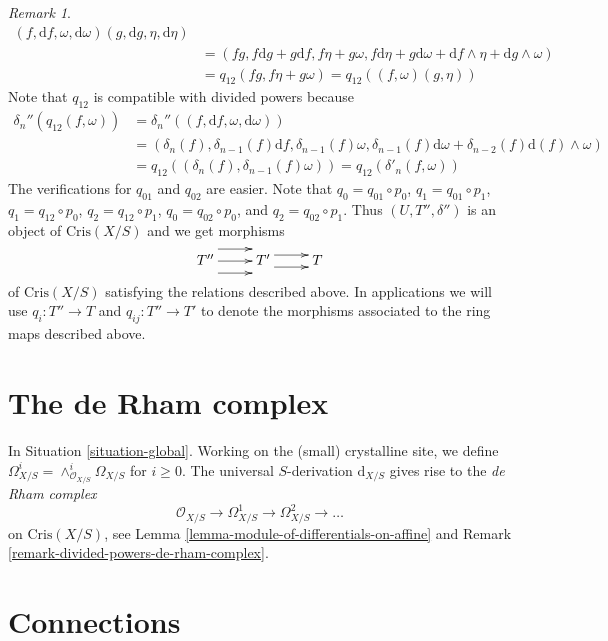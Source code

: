 \documentclass{stacks-project}
\theoremstyle{plain}
\theoremstyle{definition}
\theoremstyle{remark}
\newtheorem{remark}[subsection]{Remark}
\numberwithin{equation}{subsection}
\begin{document}
\begin{remark}
\begin{align*}
(f, \text{d}f, \omega, \text{d}\omega)(g, \text{d}g, \eta, \text{d}\eta) \\
& =
(fg, f\text{d}g + g \text{d}f, f\eta + g\omega,
f\text{d}\eta + g\text{d}\omega + \text{d}f \wedge \eta +
\text{d}g \wedge \omega) \\
& = q_{12}(fg, f\eta + g\omega) = q_{12}((f, \omega)(g, \eta))
\end{align*}
Note that $q_{12}$ is compatible with divided powers because
\begin{align*}
\delta_n''(q_{12}(f, \omega)) & =
\delta_n''((f, \text{d}f, \omega, \text{d}\omega)) \\
& =
(\delta_n(f), \delta_{n - 1}(f)\text{d}f, \delta_{n - 1}(f)\omega,
\delta_{n - 1}(f)\text{d}\omega + \delta_{n - 2}(f)\text{d}(f) \wedge \omega)
\\
& = q_{12}((\delta_n(f), \delta_{n - 1}(f)\omega)) =
q_{12}(\delta'_n(f, \omega))
\end{align*}
The verifications for $q_{01}$ and $q_{02}$ are easier.
Note that $q_0 = q_{01} \circ p_0$, $q_1 = q_{01} \circ p_1$,
$q_1 = q_{12} \circ p_0$, $q_2 = q_{12} \circ p_1$,
$q_0 = q_{02} \circ p_0$, and $q_2 = q_{02} \circ p_1$.
Thus $(U, T'', \delta'')$ is an object of $\text{Cris}(X/S)$
and we get morphisms
$$
\xymatrix{
T''
\ar@<2ex>[r]
\ar@<0ex>[r]
\ar@<-2ex>[r]
&
T'
\ar@<1ex>[r]
\ar@<-1ex>[r]
&
T
}
$$
of $\text{Cris}(X/S)$ satisfying the relations described above.
In applications we will use $q_i : T'' \to T$ and
$q_{ij} : T'' \to T'$ to denote the morphisms associated to the
ring maps described above.
\end{remark}






\section{The de Rham complex}
\label{section-de-Rham}

\noindent
In Situation \ref{situation-global}.
Working on the (small) crystalline site, we define
$\Omega^i_{X/S} = \wedge^i_{\mathcal{O}_{X/S}} \Omega_{X/S}$
for $i \geq 0$. The universal $S$-derivation $\text{d}_{X/S}$ gives
rise to the {\it de Rham complex}
$$
\mathcal{O}_{X/S} \to \Omega^1_{X/S} \to \Omega^2_{X/S} \to \ldots
$$
on $\text{Cris}(X/S)$, see
Lemma \ref{lemma-module-of-differentials-on-affine} and
Remark \ref{remark-divided-powers-de-rham-complex}.


\section{Connections}
\label{section-connections}
\end{document}
